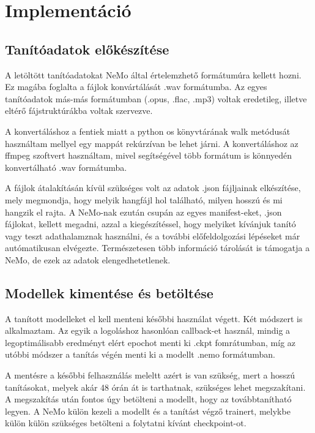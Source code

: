 \chapter{Implementáció}

\section{Tanítóadatok előkészítése}

A letöltött tanítóadatokat NeMo által értelemzhető formátumúra kellett hozni. Ez magába foglalta a fájlok konvártálását .wav formátumba. Az egyes tanítóadatok más-más formátumban (.opus, .flac, .mp3) voltak eredetileg, illetve eltérő fájstruktúrákba voltak szervezve.

A konvertáláshoz a fentiek miatt a python os könyvtárának walk metódusát használtam mellyel egy mappát rekúrzívan be lehet járni. A konvertáláshoz az ffmpeg szoftvert használtam, mivel segítségével több formátum is könnyedén konvertálható .wav formátumba.

A fájlok átalakításán kívül szükséges volt az adatok .json fájljainak elkészítése, mely megmondja, hogy melyik hangfájl hol található, milyen hosszú és mi hangzik el rajta. A NeMo-nak ezután csupán az egyes manifest-eket, .json fájlokat, kellett megadni, azzal a kiegészítéssel, hogy melyiket kívánjuk tanító vagy teszt adathalamznak használni, és a további előfeldolgozási lépéseket már autómatikusan elvégezte. Természetesen több információ tárolását is támogatja a NeMo, de ezek az adatok elengedhetetlenek.

\section{Modellek kimentése és betöltése}

A tanított modelleket el kell menteni későbbi használat végett. Két módszert is alkalmaztam. Az egyik a logoláshoz hasonlóan callback-et használ, mindig a legoptimálisabb eredményt elért epochot menti ki .ckpt fomrátumban, míg az utóbbi módszer a tanítás végén menti ki a modellt .nemo formátumban.

A mentésre a későbbi felhasználás meleltt azért is van szükség, mert a hosszú tanításokat, melyek akár 48 órán át is tarthatnak, szükséges lehet megszakítani. A megszakítás után fontos úgy betölteni a modellt, hogy az továbbtanítható legyen. A NeMo külön kezeli a modellt és a tanítást végző trainert, melykbe külön külön szükséges betölteni a folytatni kívánt checkpoint-ot.

